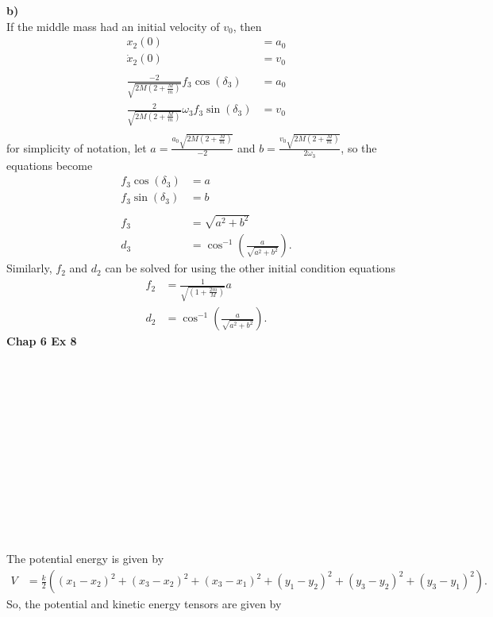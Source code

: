 \documentclass[10pt]{article}
\begin{document}
\textbf{b)}\\
If the middle mass had an initial velocity of $v_0$, then
\begin{align*}
  x_2(0) &= a_0\\
  \dot x_2(0) &= v_0\\
  \\
  \frac{-2}{\sqrt{2M\left( 2+\frac{M}{m} \right)}} f_3\cos(\delta_3) &= a_0\\
  \frac{2}{\sqrt{2M\left( 2+\frac{M}{m} \right)}} \omega_3 f_3\sin(\delta_3) &= v_0\\
\end{align*}
for simplicity of notation, let $a=\frac{a_0\sqrt{2M\left( 2+\frac{M}{m} \right)}}{-2}$
and $b=\frac{v_0\sqrt{2M\left( 2+\frac{M}{m} \right)}}{2 \omega_3}$, so the equations
become
\begin{align*}
  f_3\cos(\delta_3) &= a\\
  f_3\sin(\delta_3) &= b\\
  \\
  f_3 &= \sqrt{a^2+b^2}\\
  d_3 &= \cos^{-1}\left( \frac{a}{\sqrt{a^2+b^2}} \right).
\end{align*}
Similarly, $f_2$ and $d_2$ can be solved for using the other initial condition 
equations
\begin{align*}
  f_2 &= \frac{1}{\sqrt{\left( 1+\frac{2m}{M} \right)}}a\\
  d_2 &= \cos^{-1}\left( \frac{a}{\sqrt{a^2+b^2}} \right).
\end{align*}
\textbf{Chap 6 Ex 8}\\
\\
\\
\\
\\
\\
\\
\\
\\
\\
\\
\\
\\
\\
The potential energy is given by
\begin{align*}
  V &= \frac{k}{2}\left( (x_1-x_2)^2+(x_3-x_2)^2+(x_3-x_1)^2+(y_1-y_2)^2+(y_3-y_2)^2+(y_3-y_1)^2 \right).
\end{align*}
So, the potential and kinetic energy tensors are given by
\end{document}
